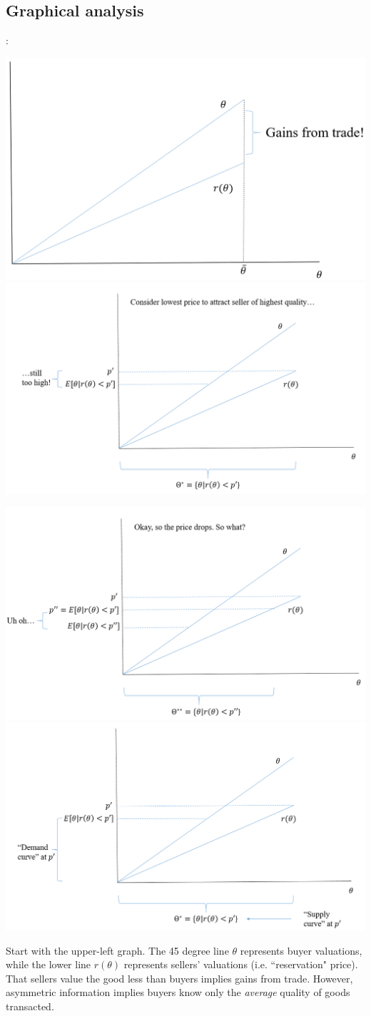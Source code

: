 \documentclass[letter,12pt]{article}
\begin{document}
\subsection{Graphical analysis}:

\includegraphics[width=.5\textwidth]{akerlof-setup.png}
\includegraphics[width=.5\textwidth]{akerlof-start.png}

\includegraphics[width=.5\textwidth]{akerlof-so_on.png}
\includegraphics[width=.5\textwidth]{akerlof-SD.png}

Start with the upper-left graph. The 45 degree line $\theta$ represents buyer valuations, while the lower line $r(\theta)$ represents sellers' valuations (i.e. ``reservation" price). That sellers value the good less than buyers implies gains from trade. However, asymmetric information implies buyers know only the \textit{average} quality of goods transacted. 
\end{document}
